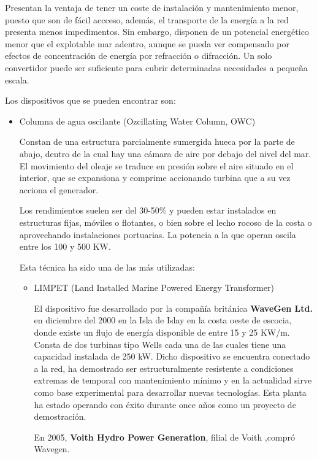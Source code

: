 \documentclass[]{article}
\begin{document}
Presentan la ventaja de tener un coste de instalación y mantenimiento
menor, puesto que son de fácil accceso, además, el transporte de la
energía a la red presenta menos impedimentos. Sin embargo, disponen de
un potencial energético menor que el explotable mar adentro, aunque se
pueda ver compensado por efectos de concentración de energía por
refracción o difracción. Un solo convertidor puede ser suficiente para
cubrir determinadas necesidades a pequeña escala.

Los dispositivos que se pueden encontrar son:

\begin{itemize}
\item
  Columna de agua oscilante (Ozcillating Water Column, OWC)

  Constan de una estructura parcialmente sumergida hueca por la parte de
  abajo, dentro de la cual hay una cámara de aire por debajo del nivel
  del mar. El movimiento del oleaje se traduce en presión sobre el aire
  situado en el interior, que se expansiona y comprime accionando
  turbina que a su vez acciona el generador.

  Los rendimientos suelen ser del 30-50\% y pueden estar instalados en
  estructuras fijas, móviles o flotantes, o bien sobre el lecho rocoso
  de la costa o aprovechando instalaciones portuarias. La potencia a la
  que operan oscila entre los 100 y 500 KW.

  Esta técnica ha sido una de las más utilizadas:

  \begin{itemize}
  \item
    LIMPET (Land Installed Marine Powered Energy Transformer)

    El dispositivo fue desarrollado por la compañía británica
    \textbf{WaveGen Ltd.} en diciembre del 2000 en la Isla de Islay en
    la costa oeste de escocia, donde existe un flujo de energía
    disponible de entre 15 y 25 KW/m. Consta de dos turbinas tipo Wells
    cada una de las cuales tiene una capacidad instalada de 250 kW.
    Dicho dispositivo se encuentra conectado a la red, ha demostrado ser
    estructuralmente resistente a condiciones extremas de temporal con
    mantenimiento mínimo y en la actualidad sirve como base experimental
    para desarrollar nuevas tecnologías. Esta planta ha estado operando
    con éxito durante once años como un proyecto de demostración.

    En 2005, \textbf{Voith Hydro Power Generation}, filial de Voith
    ,compró Wavegen.


\end{itemize}
\end{itemize}
\end{document}
